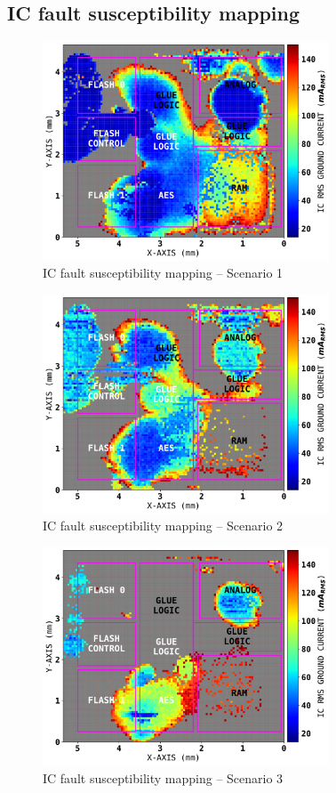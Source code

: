 \documentclass[10pt, conference, compsocconf]{IEEEtran}
\begin{document}
\subsection{IC fault susceptibility mapping}
\label{subsection:moreXPGLobalFaultMap}

\begin{figure}[!hbtp]
\centering
\includegraphics[width=3.35in]{aesBadGnd_C}
\caption{IC fault susceptibility mapping – Scenario 1}
\label{rCartos_M0_fault}
\end{figure}

\begin{figure}[!hbtp]
\centering
\includegraphics[width=3.35in]{aesGoodGndOnly_C}
\caption{IC fault susceptibility mapping – Scenario 2}
\label{rCartos_M1_fault}
\end{figure}

\begin{figure}[!hbtp]
\centering
\includegraphics[width=3.35in]{aesBouchonGgnd_C}
\caption{IC fault susceptibility mapping – Scenario 3}
\label{rCartos_M2_fault}
\end{figure}
\end{document}
